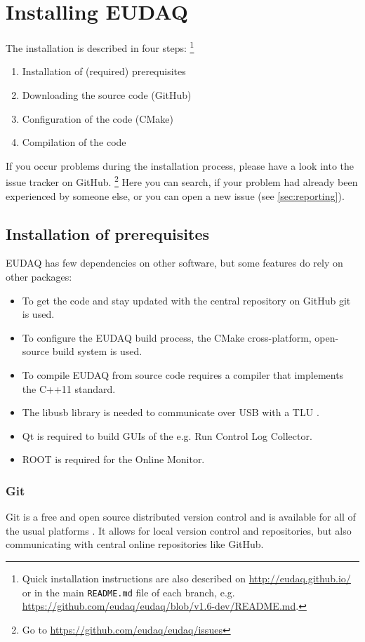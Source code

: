 \section{Installing EUDAQ}

The installation is described in four steps:%
\footnote{Quick installation instructions are also described on \url{http://eudaq.github.io/} or in the main \texttt{README.md} file of each branch, e.g. \url{https://github.com/eudaq/eudaq/blob/v1.6-dev/README.md}.}
\begin{enumerate}
\item Installation of (required) prerequisites
\item Downloading the source code (GitHub)
\item Configuration of the code (CMake)
\item Compilation of the code
\end{enumerate}

If you occur problems during the installation process, please have a look into the issue tracker on GitHub.%
\footnote{Go to \url{https://github.com/eudaq/eudaq/issues}} 
Here you can search, if your problem had already been experienced by someone else, or you can open a new issue (see \autoref{sec:reporting}).

\subsection{Installation of prerequisites}

EUDAQ has few dependencies on other software, but some features do rely on other packages:
\begin{itemize}
\item To get the code and stay updated with the central repository on GitHub git is used.
\item To configure the EUDAQ build process, the CMake cross-platform, open-source build system is used.
\item To compile EUDAQ from source code requires a compiler that implements the C++11 standard.
\item The libusb library is needed to communicate over USB with a \gls{TLU} \cite{Cussans2009}.
\item Qt is required to build GUIs of the e.g. Run Control Log Collector. 
\item ROOT is required for the Online Monitor.
\end{itemize}

\subsubsection{Git}
Git is a free and open source distributed version control and is available for all of the usual platforms \cite{gitWWW}. 
It allows for local version control and repositories, but also communicating with central online repositories like GitHub.
   
